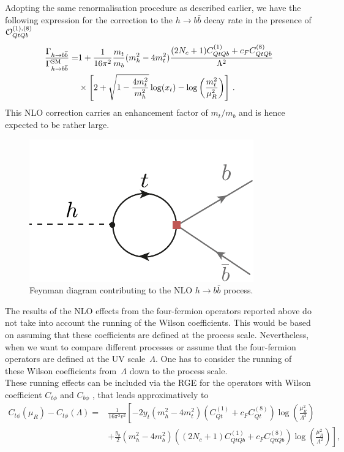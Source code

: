 \begin{description}
		Adopting the same renormalisation procedure as described earlier, we have the following expression for the correction to 
		the $h \to b\bar b$ decay rate in the presence of ${\cal O}_{QtQb}^{(1),(8)}$
		\begin{equation}
			\begin{split}
				\frac{\Gamma_{h\to b\overline{b}}}{\Gamma_{h\to b\overline{b}}^{\mathrm{SM}}}=& 1+ \frac{1}{16\pi^2}\frac{m_t}{m_b}(m_h^2-4m_t^2)\frac{(2 N_c+1) C_{QtQb}^{(1)}+c_F C_{QtQb}^{(8)}}{\Lambda^2} \\ & \times\left[ 2+\sqrt{1-\frac{4 m_t^2}{m_h^2}}\log(x_t)-\log\left(\frac{m_t^2}{\mu_R^2}\right) \right] \,.
				\label{hbbnlo}
			\end{split}
		\end{equation}
		This NLO correction carries an enhancement factor of $m_t/m_b$ and is hence expected to be rather large.
	\end{description}
	\begin{figure}[h!]
		\centering
		\includegraphics[scale=0.8]{./figures/Hbb}
		\caption{Feynman diagram contributing to the NLO   $h \to b \bar b$ process. }
		\label{hbb}
	\end{figure}
	The results of the NLO effects from the four-fermion operators reported above do not take into account the running of the Wilson coefficients. This would be based on assuming that these coefficients are defined at the process scale. Nevertheless, when we want to compare different processes or assume that the four-fermion operators are defined at the UV scale~$\Lambda$. One has to consider the running of these Wilson coefficients from~$\Lambda$ down to the process scale.\\
	These running effects can be included via the RGE for the operators with Wilson coefficient $C_{t\phi}$  and $C_{b\phi}$  \cite{Jenkins:2013zja, Jenkins:2013wua}, that leads approximatively to 
	\begin{equation}
		\begin{split}
			C_{t\phi}(\mu_R)-C_{t\phi}(\Lambda)= &\frac{1}{16 \pi^2 v^2} \left[-2  y_t (m_h^2  -4 m_t^2) (C_{Qt}^{(1)}+c_F C_{Qt}^{(8)} )\log\left( \frac{\mu_R^2}{\Lambda^2}\right) \right.\\
			& \left.+ \frac{y_b}{2} (m_h^2-4 m_b^2)\left(  (2N_c+1)  C_{QtQb}^{(1)}+   c_F C_{QtQb}^{(8)}\right)\log\left( \frac{\mu_R^2}{\Lambda^2}\right)\right], \label{eq:runningCuH}
		\end{split}
	\end{equation}

